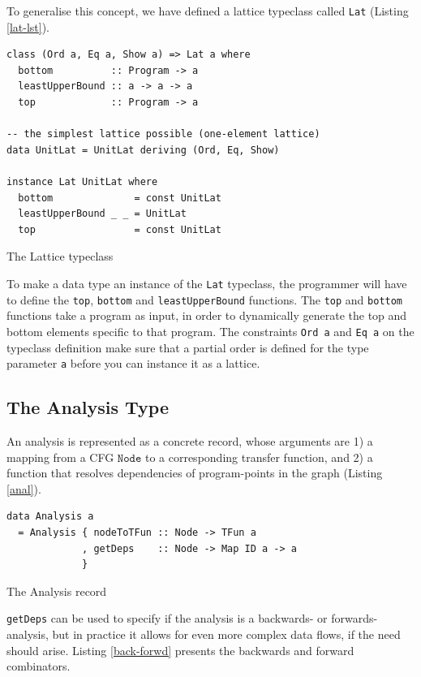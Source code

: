 \documentclass{article}
\begin{document}
To generalise this concept, we have defined a lattice typeclass called
\texttt{Lat} (Listing \ref{lat-lst}).

\begin{listing}[H]
\begin{verbatim}
class (Ord a, Eq a, Show a) => Lat a where
  bottom          :: Program -> a
  leastUpperBound :: a -> a -> a
  top             :: Program -> a

-- the simplest lattice possible (one-element lattice)
data UnitLat = UnitLat deriving (Ord, Eq, Show)

instance Lat UnitLat where
  bottom              = const UnitLat
  leastUpperBound _ _ = UnitLat
  top                 = const UnitLat
\end{verbatim}
\caption{The Lattice typeclass}
\label{lat-lst}
\end{listing}

To make a data type an instance of the \texttt{Lat} typeclass, the
programmer will have to define the \texttt{top}, \texttt{bottom} and
\texttt{leastUpperBound} functions. The \texttt{top} and \texttt{bottom}
functions take a program as input, in order to dynamically generate the
top and bottom elements specific to that program. The constraints
\texttt{Ord a} and \texttt{Eq a} on the typeclass definition make sure
that a partial order is defined for the type parameter \texttt{a} before
you can instance it as a lattice.

\subsection{The Analysis Type}\label{the-analysis-type}

An analysis is represented as a concrete record, whose arguments are
1) a mapping from a CFG $\mathtt{Node}$ to a corresponding transfer function, and 2) a function that resolves dependencies of program-points in the graph
(Listing \ref{anal}).

\begin{listing}[H]
\begin{verbatim}
data Analysis a
  = Analysis { nodeToTFun :: Node -> TFun a
             , getDeps    :: Node -> Map ID a -> a
             }
\end{verbatim}
\caption{The Analysis record}
\label{anal}
\end{listing}

\texttt{getDeps} can be used to specify if the analysis is a backwards-
or forwards-analysis, but in practice it allows for even more complex
data flows, if the need should arise. Listing \ref{back-forwd} presents the
backwards and forward combinators.
\end{document}
